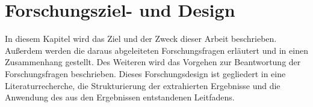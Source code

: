\chapter{Forschungsziel- und Design}

In diesem Kapitel wird das Ziel und der Zweck dieser Arbeit beschrieben. Außerdem werden die daraus abgeleiteten Forschungsfragen erläutert und in einen Zusammenhang gestellt. Des Weiteren wird das Vorgehen zur Beantwortung der Forschungsfragen beschrieben. Dieses Forschungsdesign ist gegliedert in eine Literaturrecherche, die Strukturierung der extrahierten Ergebnisse und die Anwendung des aus den Ergebnissen entstandenen Leitfadens.





